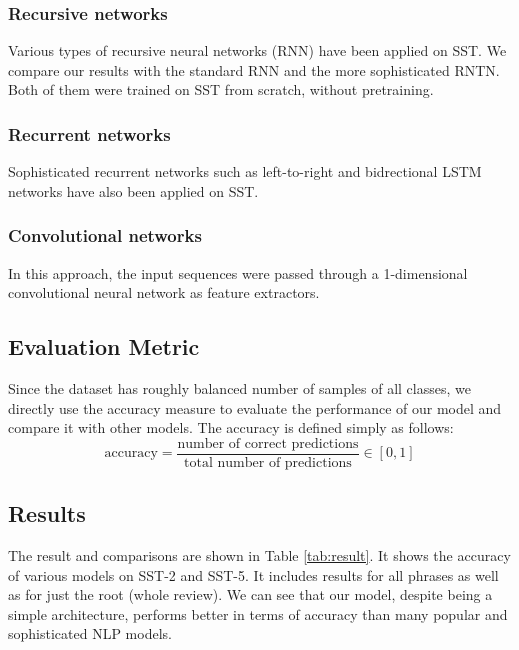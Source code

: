 \documentclass[conference]{IEEEtran}
\begin{document}
\subsubsection{Recursive networks}
Various types of recursive neural networks (RNN) have been applied on SST\cite{rntn}. We compare our results with the standard RNN and the more sophisticated RNTN. Both of them were trained on SST from scratch, without pretraining.

\subsubsection{Recurrent networks}
Sophisticated recurrent networks such as left-to-right and bidrectional LSTM networks have also been applied on SST\cite{lstm}.

\subsubsection{Convolutional networks}
In this approach, the input sequences were passed through a 1-dimensional convolutional neural network as feature extractors\cite{cnn}.

\subsection{Evaluation Metric}

Since the dataset has roughly balanced number of samples of all classes, we directly use the accuracy measure to evaluate the performance of our model and compare it with other models. The accuracy is defined simply as follows:
\begin{equation}
    \text{accuracy} =
    \frac{
        \text{number of correct predictions}
    }{
        \text{total number of predictions}
    } \in [0,1]
\end{equation}

\subsection{Results}

The result and comparisons are shown in Table \ref{tab:result}. It shows the accuracy of various models on SST-2 and SST-5. It includes results for all phrases as well as for just the root (whole review). We can see that our model, despite being a simple architecture, performs better in terms of accuracy than many popular and sophisticated NLP models.
\end{document}
